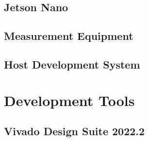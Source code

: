 \subsection{Jetson Nano}
\label{sec:jetson-nano}

\subsection{Measurement Equipment}
\label{sec:measure-equipment}

\subsection{Host Development System}
\label{sec:host}

\section{Development Tools}
\label{sec:tools}

\subsection{Vivado Design Suite 2022.2}
\label{sec:vivado}

